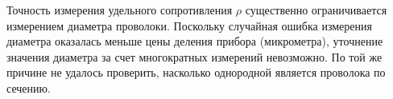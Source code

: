 \documentclass[a4paper,12pt]{article} %
\begin{document}
\medskip

\noindent Точность измерения удельного сопротивления $ \rho $ существенно ограничивается измерением
диаметра проволоки. Поскольку случайная ошибка измерения диаметра оказалась меньше
цены деления прибора (микрометра), уточнение значения диаметра за счет многократных измерений невозможно. По той же причине не удалось проверить, насколько однородной является проволока по сечению.
	
	
	
	
	
	
\end{document}
